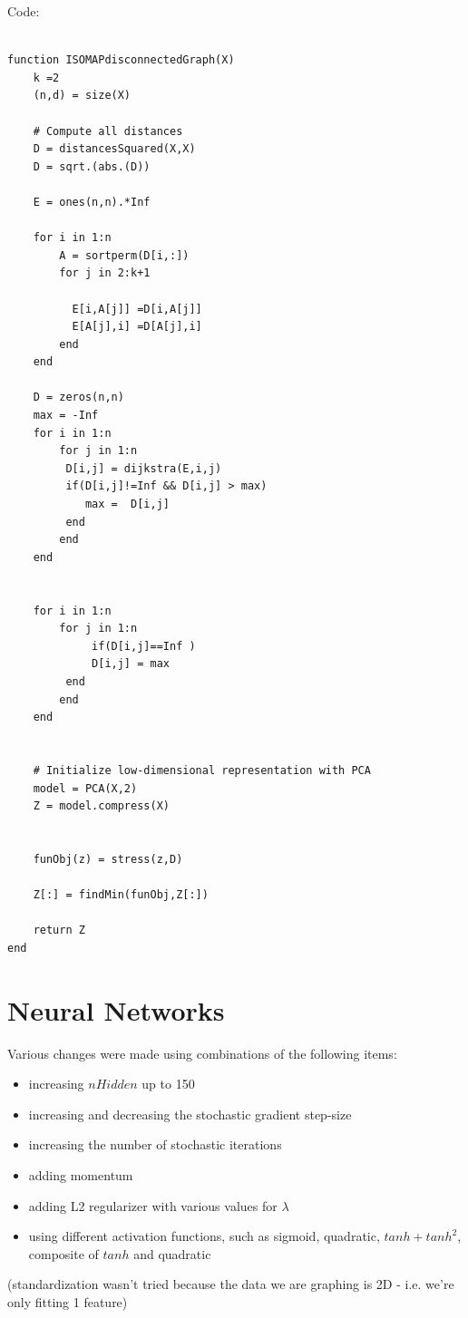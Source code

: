 \documentclass{article}
\def\items#1{\begin{itemize}#1\end{itemize}}
\begin{document}
Code:
\begin{verbatim}

function ISOMAPdisconnectedGraph(X)
    k =2
    (n,d) = size(X)

    # Compute all distances
    D = distancesSquared(X,X)
    D = sqrt.(abs.(D))

    E = ones(n,n).*Inf

    for i in 1:n
        A = sortperm(D[i,:])
        for j in 2:k+1
          
          E[i,A[j]] =D[i,A[j]]
          E[A[j],i] =D[A[j],i]     
        end 
    end

    D = zeros(n,n)
    max = -Inf
    for i in 1:n
        for j in 1:n
         D[i,j] = dijkstra(E,i,j)
         if(D[i,j]!=Inf && D[i,j] > max)
            max =  D[i,j]
         end
        end
    end


    for i in 1:n
        for j in 1:n
             if(D[i,j]==Inf )
             D[i,j] = max
         end
        end
    end


    # Initialize low-dimensional representation with PCA
    model = PCA(X,2)
    Z = model.compress(X)
    

    funObj(z) = stress(z,D)

    Z[:] = findMin(funObj,Z[:])

    return Z
end

\end{verbatim}


\section{Neural Networks}

Various changes were made using combinations of the following items:
\items{
\item increasing $nHidden$ up to 150
\item increasing and decreasing the stochastic gradient step-size
\item increasing the number of stochastic iterations
\item adding momentum
\item adding L2 regularizer with various values for $\lambda$
\item using different activation functions, such as sigmoid, quadratic, $tanh + tanh^2$, composite of $tanh$ and quadratic
}

(standardization wasn't tried because the data we are graphing is 2D - i.e. we're only fitting 1 feature)
\end{document}
